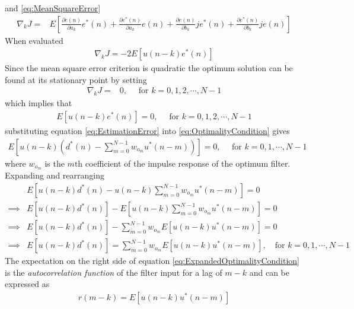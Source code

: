 and \ref{eq:MeanSquareError} %
\begin{align}
	\nabla_{k}J =& E\left[ \frac{\partial e(n)}
	{\partial a_{k}} e^{*}(n) + \frac{\partial
	e^{*}(n)}{\partial a_{k}}e(n) + \frac{
	\partial e(n)}{\partial b_{k}}je^{*}(n) 
	+ \frac{\partial e^{*}(n)}{\partial b_{
	k}}je(n)\right] \label{eq:DerivativeJ}
\end{align}
When evaluated 
\begin{align}
	\nabla_{k}J = -2E\left[u(n-k)e^{*}(n)\right]
	\label{eq:CostDerivative}
\end{align}
Since the mean square error criterion is quadratic %
the optimum solution can be found at its stationary %
point by setting
\begin{align}
	\nabla_{k}J =& 0,\quad\text{ for } k=0,1,2,\cdots,N-1
\end{align}
which implies that
\begin{align}
	E\left[u(n-k)e^{*}(n)\right] = 0,\quad\text{ for } k = 0,1,2,\cdots,N-1
	\label{eq:OptimalityCondition}
\end{align}
substituting equation \ref{eq:EstimationError} into %
\ref{eq:OptimalityCondition} gives
\begin{align}
	E\left[u(n-k)\left(d^{*}(n) - \sum_{m=0}^{N-1}w_{o_{m}}u
	^{*}(n-m)\right)\right]=0,\quad\text{ for }k=0,1,\cdots,N-1
\end{align}
where $w_{o_{m}}$ is the $m\text{th}$ coefficient of %
the impulse response of the optimum filter. Expanding and %
rearranging
\begin{align}
	&E\left[u(n-k)d^{*}(n) - u(n-k)\sum_{m=0}^{N-1}w
	_{o_{m}}u^{*}(n-m)\right] = 0\\
	\implies &E\left[u(n-k)d^{*}(n)\right] - E\left[u(n-k)\sum
	_{m=0}^{N-1}w_{o_{m}}u^{*}(n-m)\right] = 0\\
	\implies &E\left[u(n-k)d^{*}(n)\right] - \sum_{m=0}^{N-1}
	w_{o_{m}}E\left[u(n-k)u^{*}(n-m)\right] = 0\\
	\implies &E\left[u(n-k)d^{*}(n)\right] = 
	\sum_{m=0}^{N-1}w_{o_{m}}E\left[u(n-k)u^{*}(
	n-m)\right],\quad\text{for }k=0,1,\cdots,N-1
	\label{eq:ExpandedOptimalityCondition}
\end{align}
The expectation on the right side of equation %
\ref{eq:ExpandedOptimalityCondition} is the %
\emph{autocorrelation function} of the filter input %
for a lag of $m-k$ and can be expressed as
\begin{align}
	r(m-k) = E\left[u(n-k)u^{*}(n-m)\right]
	\label{eq:WienerAutocorrelation}
\end{align}
